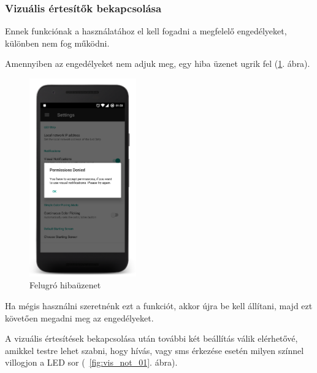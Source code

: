 \documentclass[../main.tex]{subfiles}
\begin{document}
            \subsubsection{Vizuális értesítők bekapcsolása}
                Ennek funkciónak a használatához el kell fogadni a megfelelő engedélyeket, különben nem fog működni.
                
                Amennyiben az engedélyeket nem adjuk meg, egy hiba üzenet ugrik fel (\ref{fig:permission_denied}. ábra).
                \begin{figure}[h!]
                    \centering
                    \includegraphics[width=4.6cm]{android_res/screen_pictures/visual_notification_02.png}
                    \caption{Felugró hibaüzenet}
                    \label{fig:permission_denied}
                \end{figure}
                Ha mégis használni szeretnénk ezt a funkciót, akkor újra be kell állítani, majd ezt követően megadni meg az engedélyeket.
                
                A vizuális értesítések bekapcsolása után további két beállítás válik elérhetővé, amikkel testre lehet szabni, hogy hívás, vagy sms érkezése esetén milyen színnel villogjon a LED sor (~\ref{fig:vis_not_01}. ábra).
                
\end{document}
